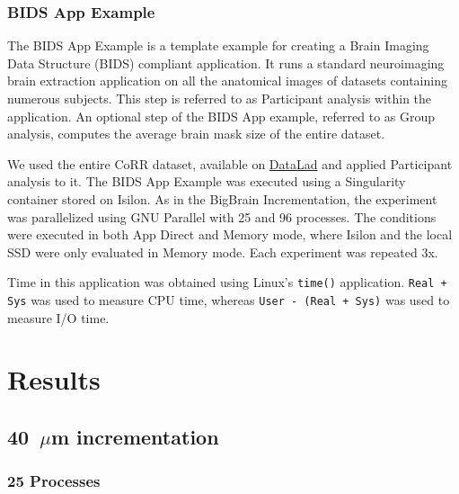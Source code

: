 \subsubsection{BIDS App Example}

The BIDS App Example is a template example for creating a Brain Imaging Data
Structure (BIDS) compliant application. It runs a standard neuroimaging brain
extraction application on all the anatomical images of datasets containing
numerous subjects. This step is referred to as Participant analysis within the
application. An optional step of the BIDS App example, referred to as Group
analysis, computes the average brain mask size of the entire dataset.

We used the entire CoRR dataset, available on
\href{https://www.datalad.org/}{DataLad} and applied Participant analysis to it.
The BIDS App Example was executed using a Singularity container stored on
Isilon. As in the BigBrain Incrementation, the experiment was parallelized using
GNU Parallel with 25 and 96 processes. The conditions were executed in both App
Direct and Memory mode, where Isilon and the local SSD were only evaluated in
Memory mode. Each experiment was repeated 3x.

Time in this application was obtained using Linux's \texttt{time()} application.
\texttt{Real + Sys} was used to measure CPU time, whereas \texttt{User - (Real +
Sys)} was used to measure I/O time.
\section{Results}

\subsection{40~$\mu$m \bigbrain incrementation}
\subsubsection{25 Processes}



